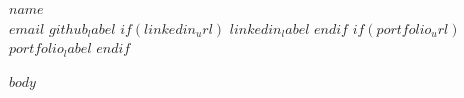 \documentclass[10pt,a4paper]{article}
\begin{document}
\begin{center}
  {\LARGE\bfseries $name$}\\[4pt]
  \small
  \href{mailto:$email$}{\underline{$email$}}
  \enspace \textbar\enspace
  \href{$github_url$}{\underline{$github_label$}}
$if(linkedin_url)$
  \enspace \textbar\enspace
  \href{$linkedin_url$}{\underline{$linkedin_label$}}
$endif$
$if(portfolio_url)$
  \enspace \textbar\enspace
  \href{$portfolio_url$}{\underline{$portfolio_label$}}
$endif$
\end{center}

\vspace{-6pt}

$body$
\end{document}
